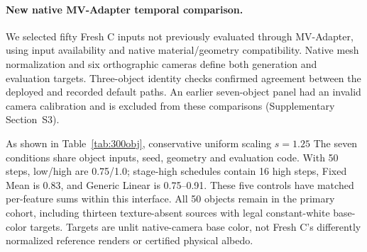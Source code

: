 \documentclass[times,twocolumn,final]{elsarticle}
\providecommand{\DIFadd}[1]{{\protect\color{blue} \sf #1}} %
\providecommand{\DIFdel}[1]{{\protect\color{red} \scriptsize #1}} %
\providecommand{\DIFaddbegin}{} %
\providecommand{\DIFaddend}{} %
\providecommand{\DIFdelbegin}{} %
\providecommand{\DIFdelend}{} %
\begin{document}
\DIFdelbegin %
\DIFdelend \DIFaddbegin \paragraph{New native MV-Adapter temporal comparison.}
\label{subsec:new-mva}
\DIFadd{We selected fifty Fresh C inputs not previously evaluated through MV-Adapter, using input availability and native material/geometry compatibility. Native mesh normalization and six orthographic cameras define both generation and evaluation targets. Three-object identity checks confirmed agreement between the deployed and recorded default paths. An earlier seven-object panel had an invalid camera calibration and is excluded from these comparisons (Supplementary Section~S3).
}\DIFaddend 

\DIFdelbegin \DIFdel{As shown in Table~\ref{tab:300obj}, conservative uniform scaling $s = 1.25$ }\DIFdelend \DIFaddbegin \DIFadd{The seven conditions share object inputs, seed, geometry and evaluation code. With 50 steps, low/high are 0.75/1.0; stage-high schedules contain 16 high steps, Fixed Mean is 0.83, and Generic Linear is 0.75--0.91. These five controls have matched per-feature sums within this interface. All 50 objects remain in the primary cohort, including thirteen texture-absent sources with legal constant-white base-color targets. Targets are unlit native-camera base color, not Fresh C's differently normalized reference renders or certified physical albedo.
}
\end{document}
